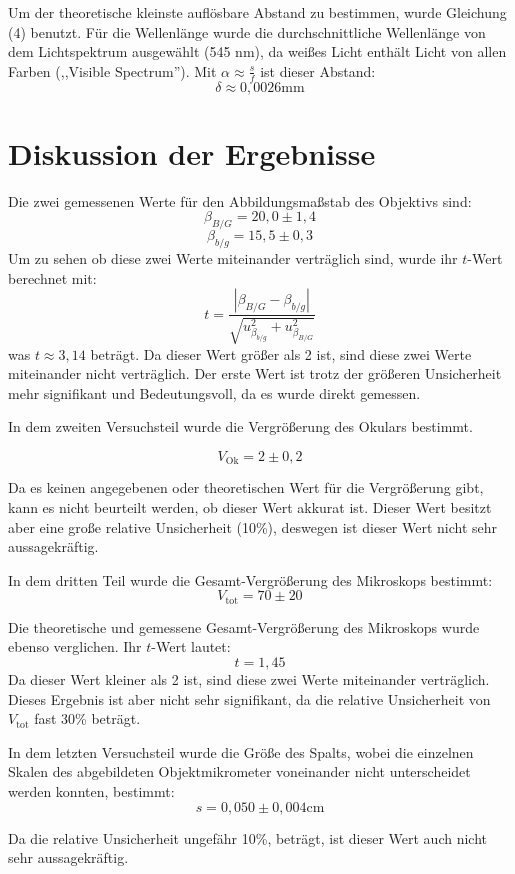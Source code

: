 \documentclass[11pt,a4paper]{article}
\begin{document}
Um der theoretische kleinste auflösbare Abstand zu bestimmen, wurde Gleichung (4) benutzt. Für die Wellenlänge wurde die durchschnittliche Wellenlänge von dem Lichtspektrum ausgewählt (545 nm), da weißes Licht enthält Licht von allen Farben (,,Visible Spectrum''). Mit $\alpha \approx \frac{s}{f}$ ist dieser Abstand:
$$\delta \approx 0,0026 \textrm{mm}$$


\section{Diskussion der Ergebnisse}
Die zwei gemessenen Werte für den Abbildungsmaßstab des Objektivs sind:
$$ \beta_{B/G} = 20,0 \pm 1,4$$
$$ \beta_{b/g} = 15,5 \pm 0,3$$
Um zu sehen ob diese zwei Werte miteinander verträglich sind, wurde ihr $t$-Wert berechnet mit:
\begin{equation}
t = \frac{|\beta_{B/G}-\beta_{b/g}| }{\sqrt{u_{\beta_{b/g}}^2+u_{\beta_{B/G}}^2}}
\end{equation}
was $t\approx3,14$ beträgt. Da dieser Wert größer als 2 ist, sind diese zwei Werte miteinander nicht verträglich. Der erste Wert ist trotz der größeren Unsicherheit mehr signifikant und Bedeutungsvoll, da es wurde direkt gemessen. 

In dem zweiten Versuchsteil wurde die Vergrößerung des Okulars bestimmt. 

$$V_\textrm{Ok} = 2 \pm 0,2$$

Da es keinen angegebenen oder theoretischen Wert für die Vergrößerung gibt, kann es nicht beurteilt werden, ob dieser Wert akkurat ist. Dieser Wert besitzt aber eine große relative Unsicherheit (10\%), deswegen ist dieser Wert nicht sehr aussagekräftig. 

In dem dritten Teil wurde die Gesamt-Vergrößerung des Mikroskops bestimmt:
$$V_\textrm{tot} = 70 \pm 20$$

Die theoretische und gemessene Gesamt-Vergrößerung des Mikroskops wurde ebenso verglichen. Ihr $t$-Wert lautet:
$$t = 1,45 $$
Da dieser Wert kleiner als 2 ist, sind diese zwei Werte miteinander verträglich. Dieses Ergebnis ist aber nicht sehr signifikant, da die relative Unsicherheit von $V_\textrm{tot}$ fast 30\% beträgt.

In dem letzten Versuchsteil wurde die Größe des Spalts, wobei die einzelnen Skalen des abgebildeten Objektmikrometer voneinander nicht unterscheidet werden konnten, bestimmt:
$$s = 0,050 \pm 0,004 \textrm{cm}$$

Da die relative Unsicherheit ungefähr 10\%, beträgt, ist dieser Wert auch nicht sehr aussagekräftig. 
\end{document}
